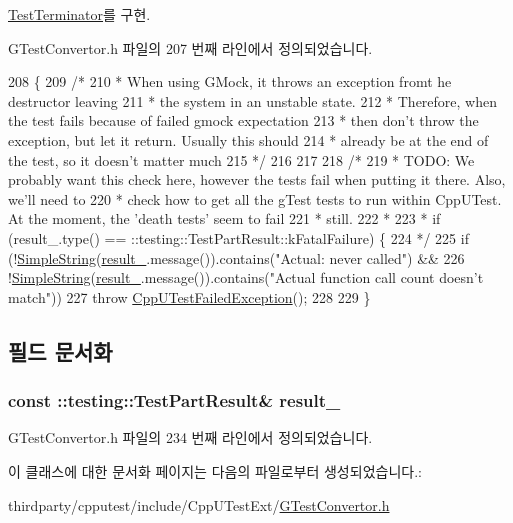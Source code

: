 \hyperlink{class_test_terminator_a57ed831fce5fb42abbfaf37b392eaa2f}{Test\+Terminator}를 구현.



G\+Test\+Convertor.\+h 파일의 207 번째 라인에서 정의되었습니다.


\begin{DoxyCode}
208     \{
209         \textcolor{comment}{/*}
210 \textcolor{comment}{         * When using GMock, it throws an exception fromt he destructor leaving}
211 \textcolor{comment}{         * the system in an unstable state.}
212 \textcolor{comment}{         * Therefore, when the test fails because of failed gmock expectation}
213 \textcolor{comment}{         * then don't throw the exception, but let it return. Usually this should}
214 \textcolor{comment}{         * already be at the end of the test, so it doesn't matter much}
215 \textcolor{comment}{         */}
216 
217 
218         \textcolor{comment}{/*}
219 \textcolor{comment}{         * TODO: We probably want this check here, however the tests fail when putting it there. Also,
       we'll need to}
220 \textcolor{comment}{         * check how to get all the gTest tests to run within CppUTest. At the moment, the 'death tests'
       seem to fail}
221 \textcolor{comment}{         * still.}
222 \textcolor{comment}{         *}
223 \textcolor{comment}{         * if (result\_.type() == ::testing::TestPartResult::kFatalFailure) \{}
224 \textcolor{comment}{         */}
225             \textcolor{keywordflow}{if} (!\hyperlink{class_simple_string}{SimpleString}(\hyperlink{class_g_mock_test_terminator_a973cbfe7c668f4c83893fc2db40a6988}{result\_}.message()).contains(\textcolor{stringliteral}{"Actual: never called"}) &&
226                     !\hyperlink{class_simple_string}{SimpleString}(\hyperlink{class_g_mock_test_terminator_a973cbfe7c668f4c83893fc2db40a6988}{result\_}.message()).contains(\textcolor{stringliteral}{"Actual function call
       count doesn't match"}))
227                 \textcolor{keywordflow}{throw} \hyperlink{class_cpp_u_test_failed_exception}{CppUTestFailedException}();
228 
229     \}
\end{DoxyCode}


\subsection{필드 문서화}
\subsubsection[{\texorpdfstring{result\+\_\+}{result_}}]{\setlength{\rightskip}{0pt plus 5cm}const \+::testing\+::\+Test\+Part\+Result\& result\+\_\+\hspace{0.3cm}{\ttfamily [private]}}\hypertarget{class_g_mock_test_terminator_a973cbfe7c668f4c83893fc2db40a6988}{}\label{class_g_mock_test_terminator_a973cbfe7c668f4c83893fc2db40a6988}


G\+Test\+Convertor.\+h 파일의 234 번째 라인에서 정의되었습니다.



이 클래스에 대한 문서화 페이지는 다음의 파일로부터 생성되었습니다.\+:\begin{DoxyCompactItemize}
\item 
thirdparty/cpputest/include/\+Cpp\+U\+Test\+Ext/\hyperlink{_g_test_convertor_8h}{G\+Test\+Convertor.\+h}\end{DoxyCompactItemize}
